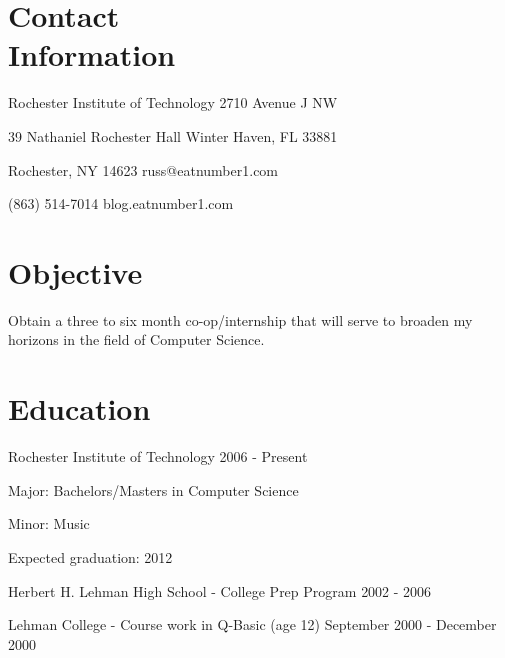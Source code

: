 \documentclass[margin,line]{resume}
\begin{document}
\begin{resume}

\section{\mysidestyle Contact \\ Information}\vspace{2mm}
	\begin{asparablank}
		\item Rochester Institute of Technology \hfill 2710 Avenue J NW
		\item 39 Nathaniel Rochester Hall \hfill Winter Haven, FL 33881
		\item Rochester, NY 14623 \hfill russ@eatnumber1.com
		\item (863) 514-7014 \hfill blog.eatnumber1.com
	\end{asparablank}

\section{\mysidestyle Objective}
	Obtain a three to six month co-op/internship that will serve to broaden my
	horizons in the field of Computer Science.

\section{\mysidestyle Education}
	\begin{compactdesc}
		\item[Rochester Institute of Technology] \hfill {\footnotesize 2006 - Present}
		\begin{compactitem}
			\item {\small Major: Bachelors/Masters in Computer Science}
			\item {\small Minor: Music}
			\item {\small Expected graduation: 2012}
		\end{compactitem}
		\item[Herbert H. Lehman High School] - College Prep Program \hfill
		{\footnotesize 2002 - 2006}
		\item[Lehman College] - Course work in Q-Basic (age 12) \hfill
		{\footnotesize September 2000 - December 2000}
	\end{compactdesc}


\end{resume}
\end{document}
